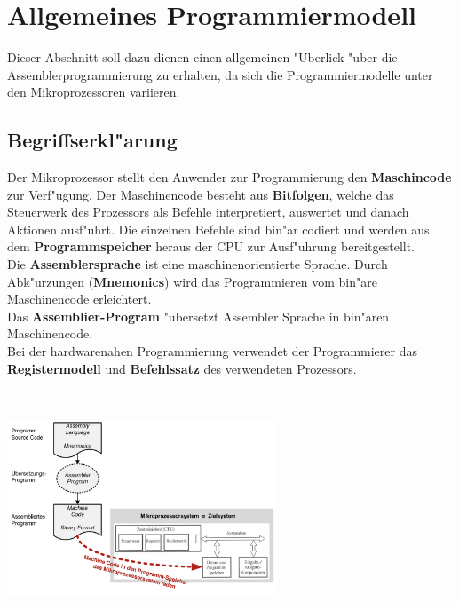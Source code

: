 \section{Allgemeines Programmiermodell}
Dieser Abschnitt soll dazu dienen einen allgemeinen "Uberlick "uber die Assemblerprogrammierung zu erhalten, da sich die Programmiermodelle unter den Mikroprozessoren variieren.
\subsection{Begriffserkl"arung}
\begin{minipage}{10cm}
	Der Mikroprozessor stellt den Anwender zur Programmierung den \textbf{Maschincode} zur Verf"ugung. Der Maschinencode besteht aus \textbf{Bitfolgen}, welche das Steuerwerk des Prozessors als Befehle interpretiert, auswertet und danach Aktionen ausf"uhrt. Die einzelnen Befehle sind bin"ar codiert und werden aus dem \textbf{Programmspeicher} heraus der CPU zur Ausf"uhrung bereitgestellt.\\
	
	Die \textbf{Assemblersprache} ist eine maschinenorientierte Sprache. Durch Abk"urzungen (\textbf{Mnemonics}) wird das Programmieren vom bin"are Maschinencode erleichtert.\\
	
	Das \textbf{Assemblier-Program} "ubersetzt Assembler Sprache in bin"aren Maschinencode.\\
	
	Bei der hardwarenahen Programmierung verwendet der Programmierer das \textbf{Registermodell} und \textbf{Befehlssatz} des verwendeten Prozessors.
\end{minipage}
%
\begin{minipage}{0.5cm}
	\ \
\end{minipage}
%
\begin{minipage}{8cm}
	\includegraphics[width = 8cm]{pics/Programmiermodell}
\end{minipage}
	
